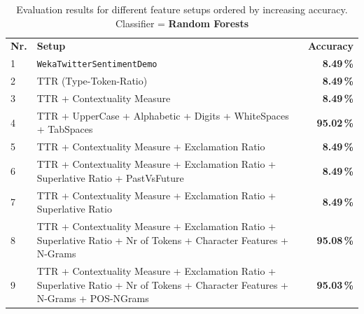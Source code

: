 \documentclass[journal, a4paper, 12pt]{IEEEtran}
\begin{document}
\begin{table}[!hbt]
	\begin{center}
		\caption{Evaluation results for different feature setups ordered by increasing accuracy.
		Classifier = \textbf{Random Forests}}
		\label{tab:results-rf}
		\begin{tabularx}{80mm}{| l | X | r |}
			\hline
			\rowcolor{lightgray}
			\multicolumn{3}{| c |}{\textbf{Random Forest}} 								\\ \hline
			\rowcolor{lightgray}
			\textbf{Nr.}		&	\textbf{Setup}					& \textbf{Accuracy}		\\ \hline\hline
			1			&	\texttt{WekaTwitterSentimentDemo}	& \textbf{8.49\,\%}		\\ \hline
			2			&	TTR (Type-Token-Ratio)				& \textbf{8.49\,\%}		\\ \hline
			3			&	TTR + Contextuality Measure			& \textbf{8.49\,\%}		\\ \hline
			4			&	TTR + UpperCase + Alphabetic + Digits + WhiteSpaces + TabSpaces
																& \textbf{95.02\,\%}		\\ \hline
			5			& 	TTR + Contextuality Measure + Exclamation Ratio
																& \textbf{8.49\,\%}		\\ \hline
			6			&	TTR + Contextuality Measure + Exclamation Ratio + Superlative Ratio + PastVsFuture 
																& \textbf{8.49\,\%}		\\ \hline
			7			&	TTR + Contextuality Measure + Exclamation Ratio + Superlative Ratio 
																& \textbf{8.49\,\%}		\\ \hline
			8			&	TTR + Contextuality Measure + Exclamation Ratio + Superlative Ratio +
							Nr of Tokens + Character Features + N-Grams
																& \textbf{95.08\,\%}		\\ \hline
			9			&	TTR + Contextuality Measure + Exclamation Ratio + Superlative Ratio +
							Nr of Tokens + Character Features + N-Grams + POS-NGrams
																& \textbf{95.03\,\%}		\\ \hline
			\hline
		\end{tabularx}
	\end{center}
\end{table}
\end{document}
